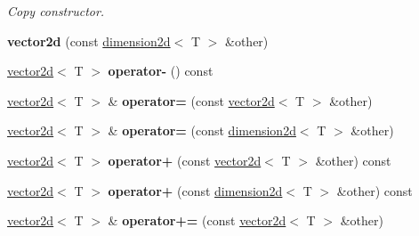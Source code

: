 \begin{DoxyCompactItemize}
\begin{DoxyCompactList}\small\item\em Copy constructor. \end{DoxyCompactList}\item 
{\bfseries vector2d} (const \hyperlink{classirr_1_1core_1_1dimension2d}{dimension2d}$<$ T $>$ \&other)\hypertarget{classirr_1_1core_1_1vector2d_ad394222b16dcdc23c416d57acbb367cb}{}\label{classirr_1_1core_1_1vector2d_ad394222b16dcdc23c416d57acbb367cb}

\item 
\hyperlink{classirr_1_1core_1_1vector2d}{vector2d}$<$ T $>$ {\bfseries operator-\/} () const \hypertarget{classirr_1_1core_1_1vector2d_ad3fec2fa4ab4a2c6e5705d67399ee84c}{}\label{classirr_1_1core_1_1vector2d_ad3fec2fa4ab4a2c6e5705d67399ee84c}

\item 
\hyperlink{classirr_1_1core_1_1vector2d}{vector2d}$<$ T $>$ \& {\bfseries operator=} (const \hyperlink{classirr_1_1core_1_1vector2d}{vector2d}$<$ T $>$ \&other)\hypertarget{classirr_1_1core_1_1vector2d_a26ed12896e0f2b596b90104a10afabe1}{}\label{classirr_1_1core_1_1vector2d_a26ed12896e0f2b596b90104a10afabe1}

\item 
\hyperlink{classirr_1_1core_1_1vector2d}{vector2d}$<$ T $>$ \& {\bfseries operator=} (const \hyperlink{classirr_1_1core_1_1dimension2d}{dimension2d}$<$ T $>$ \&other)\hypertarget{classirr_1_1core_1_1vector2d_a0ee6c8bafead525cd415c84cf74012f2}{}\label{classirr_1_1core_1_1vector2d_a0ee6c8bafead525cd415c84cf74012f2}

\item 
\hyperlink{classirr_1_1core_1_1vector2d}{vector2d}$<$ T $>$ {\bfseries operator+} (const \hyperlink{classirr_1_1core_1_1vector2d}{vector2d}$<$ T $>$ \&other) const \hypertarget{classirr_1_1core_1_1vector2d_ad61d79f7e748f3b02eb57cc61c231a99}{}\label{classirr_1_1core_1_1vector2d_ad61d79f7e748f3b02eb57cc61c231a99}

\item 
\hyperlink{classirr_1_1core_1_1vector2d}{vector2d}$<$ T $>$ {\bfseries operator+} (const \hyperlink{classirr_1_1core_1_1dimension2d}{dimension2d}$<$ T $>$ \&other) const \hypertarget{classirr_1_1core_1_1vector2d_a03cea10fda9ab64ad0378ab78bcbb101}{}\label{classirr_1_1core_1_1vector2d_a03cea10fda9ab64ad0378ab78bcbb101}

\item 
\hyperlink{classirr_1_1core_1_1vector2d}{vector2d}$<$ T $>$ \& {\bfseries operator+=} (const \hyperlink{classirr_1_1core_1_1vector2d}{vector2d}$<$ T $>$ \&other)\hypertarget{classirr_1_1core_1_1vector2d_a9562439453b7fe491e3f3310e6e36440}{}\label{classirr_1_1core_1_1vector2d_a9562439453b7fe491e3f3310e6e36440}


\end{DoxyCompactItemize}
